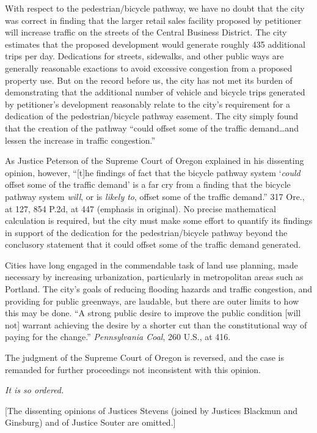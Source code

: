With respect to the pedestrian/bicycle pathway, we have no doubt that the city
was correct in finding that the larger retail sales facility proposed by
petitioner will increase traffic on the streets of the Central Business
District. The city estimates that the proposed development would generate
roughly 435 additional trips per day. Dedications for streets, sidewalks, and
other public ways are generally reasonable exactions to avoid excessive
congestion from a proposed property use. But on the record before us, the city
has not met its burden of demonstrating that the additional number of vehicle
and bicycle trips generated by petitioner's development reasonably relate to the
city's requirement for a dedication of the pedestrian/bicycle pathway easement.
The city simply found that the creation of the pathway ``could offset some of
the traffic demand\ldots and lessen the increase in traffic congestion.''

As Justice Peterson of the Supreme Court of Oregon explained in his dissenting
opinion, however, ``[t]he findings of fact that the bicycle pathway system
`\textit{could} offset some of the traffic demand' is a far cry from a finding
that the bicycle pathway system \textit{will}, or is \textit{likely to}, offset
some of the traffic demand.'' 317 Ore., at 127, 854 P.2d, at 447 (emphasis in
original). No precise mathematical calculation is required, but the city must
make some effort to quantify its findings in support of the dedication for the
pedestrian/bicycle pathway beyond the conclusory statement that it could offset
some of the traffic demand generated.



Cities have long engaged in the commendable task of land use planning, made
necessary by increasing urbanization, particularly in metropolitan areas such as
Portland. The city's goals of reducing flooding hazards and traffic congestion,
and providing for public greenways, are laudable, but there are outer limits to
how this may be done. ``A strong public desire to improve the public condition
[will not] warrant achieving the desire by a shorter cut than the constitutional
way of paying for the change.'' \textit{Pennsylvania Coal}, 260 U.S., at 416.

The judgment of the Supreme Court of Oregon is reversed, and the case is
remanded for further proceedings not inconsistent with this opinion.

\textit{It is so ordered.}

[The dissenting opinions of Justices Stevens (joined by Justices Blackmun and
Ginsburg) and of Justice Souter are omitted.]

